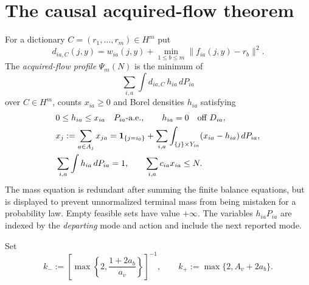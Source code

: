 \section{The causal acquired-flow theorem}
\label{sec:central}
For a dictionary $C=(r_1,\ldots,r_m)\in H^m$ put
\[
 d_{ia,C}(j,y)=w_{ia}(j,y)+\min_{1\le b\le m}\|f_{ia}(j,y)-r_b\|^2.
\]
The \emph{acquired-flow profile} $\Psi_m(N)$ is the minimum of
\begin{equation}\label{eq:objective}
 \sum_{i,a}\int d_{ia,C}\,h_{ia}\,dP_{ia}
\end{equation}
over $C\in H^m$, counts $x_{ia}\ge0$ and Borel densities $h_{ia}$ satisfying
\begin{align}
 &0\le h_{ia}\le x_{ia}\quad P_{ia}\text{-a.e.},\qquad
 h_{ia}=0\quad\text{off }D_{ia},\label{eq:flow-box}\\
 &x_j:=\sum_{a\in A_j}x_{ja}
 =\mathbf1_{\{j=i_0\}}+
   \sum_{i,a}\int_{\{j\}\times Y_{ia}}(x_{ia}-h_{ia})\,dP_{ia},\label{eq:flow-balance}\\
 &\sum_{i,a}\int h_{ia}\,dP_{ia}=1,\qquad
   \sum_{i,a}c_{ia}x_{ia}\le N.\label{eq:flow-cost}
\end{align}
The mass equation is redundant after summing the finite balance equations, but is displayed to prevent unnormalized terminal mass from being mistaken for a probability law. Empty feasible sets have value $+\infty$. The variables $h_{ia}P_{ia}$ are indexed by the \emph{departing} mode and action and include the next reported mode.

Set
\[
 k_-:=\left[\max\left\{2,\frac{1+2a_b}{a_v}\right\}\right]^{-1},
 \qquad k_+:=\max\{2,A_v+2a_b\}.
\]

